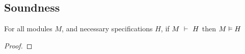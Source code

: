 %
%
%
%
%
%





\subsection{Soundness}
\begin{theorem}[Soundness]
For all modules $M$, and necessary specifications $H$, if
$M\ \vdash\ H$ then $M \vDash H$
\end{theorem}
\begin{proof}
\end{proof}
